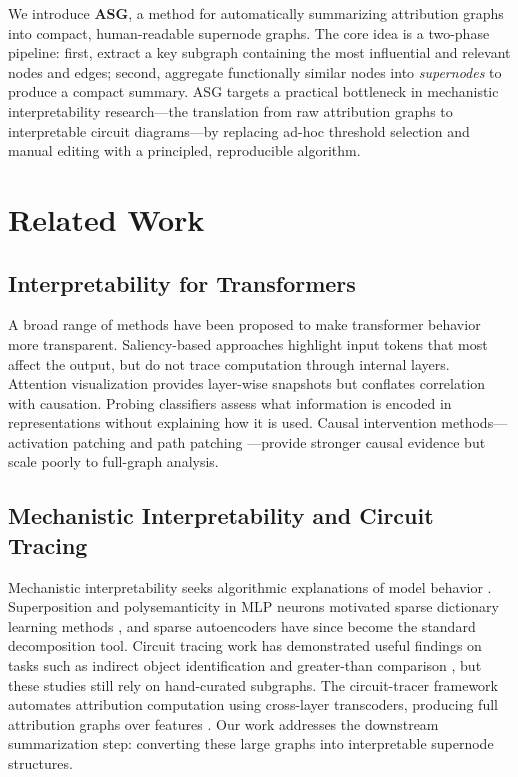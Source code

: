 \documentclass[11pt]{article}
\begin{document}
We introduce \textbf{ASG}, a method for automatically summarizing attribution graphs into compact, human-readable supernode graphs. The core idea is a two-phase pipeline: first, extract a key subgraph containing the most influential and relevant nodes and edges; second, aggregate functionally similar nodes into \emph{supernodes} to produce a compact summary. ASG targets a practical bottleneck in mechanistic interpretability research—the translation from raw attribution graphs to interpretable circuit diagrams—by replacing ad-hoc threshold selection and manual editing with a principled, reproducible algorithm.

\section{Related Work}

\subsection{Interpretability for Transformers}
A broad range of methods have been proposed to make transformer behavior more transparent. Saliency-based approaches \cite{simonyan2013deep,sundararajan2017axiomatic} highlight input tokens that most affect the output, but do not trace computation through internal layers. Attention visualization \cite{clark2019does} provides layer-wise snapshots but conflates correlation with causation. Probing classifiers \cite{belinkov2022probing} assess what information is encoded in representations without explaining how it is used. Causal intervention methods—activation patching \cite{meng2022locating} and path patching \cite{goldowsky2023localizing}—provide stronger causal evidence but scale poorly to full-graph analysis.

\subsection{Mechanistic Interpretability and Circuit Tracing}
Mechanistic interpretability seeks algorithmic explanations of model behavior \cite{olah2020zoom}. Superposition and polysemanticity in MLP neurons motivated sparse dictionary learning methods \cite{bricken2023monosemanticity,cunningham2023sparse}, and sparse autoencoders have since become the standard decomposition tool. Circuit tracing work has demonstrated useful findings on tasks such as indirect object identification \cite{wang2022interpretability} and greater-than comparison \cite{hanna2023does}, but these studies still rely on hand-curated subgraphs. The circuit-tracer framework \cite{circuit-tracer} automates attribution computation using cross-layer transcoders, producing full attribution graphs over features \cite{arxiv:2410.13032}. Our work addresses the downstream summarization step: converting these large graphs into interpretable supernode structures.
\end{document}
